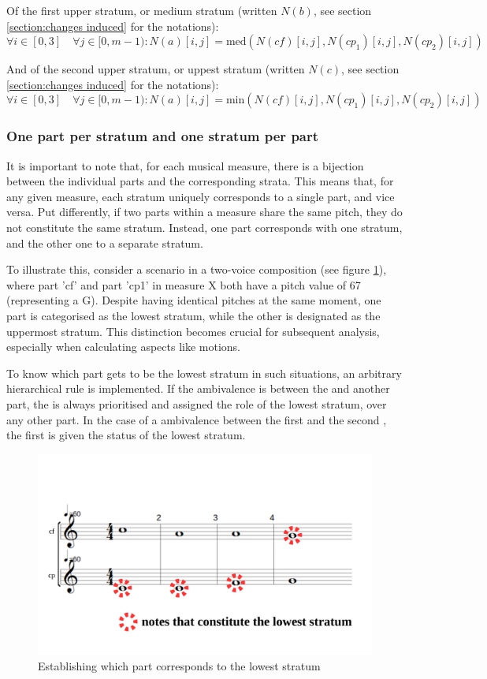 Of the first upper stratum, or medium stratum (written $N(b)$, see section \ref{section:changes induced} for the notations):
\begin{equation}
    \forall i \in [0, 3] \quad \forall j \in [0, m-1): N(a)[i,j] = \text{med} (N(cf)[i,j], N(cp_1)[i,j], N(cp_2)[i,j])
\end{equation}

And of the second upper stratum, or uppest stratum (written $N(c)$, see section \ref{section:changes induced} for the notations):
\begin{equation}
    \forall i \in [0, 3] \quad \forall j \in [0, m-1): N(a)[i,j] = \text{min} (N(cf)[i,j], N(cp_1)[i,j], N(cp_2)[i,j])
\end{equation}

\subsubsection{One part per stratum and one stratum per part} \label{subsubsection:one-part-per-stratum}
It is important to note that, for each musical measure, there is a bijection between the individual parts and the corresponding strata. This means that, for any given measure, each stratum uniquely corresponds to a single part, and vice versa. Put differently, if two parts within a measure share the same pitch, they do not constitute the same stratum. Instead, one part corresponds with one stratum, and the other one to a separate stratum.

To illustrate this, consider a scenario in a two-voice composition (see figure \ref{fig:one-voice-max-can-be-a}), where part 'cf' and part 'cp1' in measure X both have a pitch value of 67 (representing a G). Despite having identical pitches at the same moment, one part is categorised as the lowest stratum, while the other is designated as the uppermost stratum. This distinction becomes crucial for subsequent analysis, especially when calculating aspects like motions.

To know which part gets to be the lowest stratum in such situations, an arbitrary hierarchical rule is implemented. If the ambivalence is between the \cfs and another part, the \cfs is always prioritised and assigned the role of the lowest stratum, over any other part. In the case of a ambivalence between the first \cp and the second \cp, the first \cp is given the status of the lowest stratum. 

\begin{figure}[h]
    \centering
    \includegraphics[width=.5\textwidth]{Images/one-voice-max-can-be-a.png}
    \caption{Establishing which part corresponds to the lowest stratum}
    \label{fig:one-voice-max-can-be-a}
  \end{figure}

